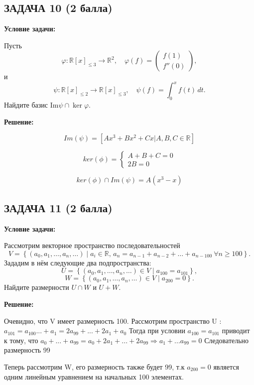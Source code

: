 \documentclass[a4paper,12pt]{article}
\begin{document}
\vspace{1cm}

\subsection{ЗАДАЧА 10 \hfill \textbf{(2 балла)}}
\textbf{Условие задачи:}

Пусть
\[
\varphi: \mathbb{R}[x]_{\leq 3} \to \mathbb{R}^2, \quad \varphi(f) =
\begin{pmatrix}
f(1) \\
f''(0)
\end{pmatrix},
\]
и
\[
\psi: \mathbb{R}[x]_{\leq 2} \to \mathbb{R}[x]_{\leq 3}, \quad \psi(f) = \int_0^x f(t) \, dt.
\]
Найдите базис \( \text{Im} \psi \cap \ker \varphi \).

\textbf{Решение:}

\[
Im(\psi) = \left[Ax^3 + Bx^2 + Cx | A, B, C \in \mathbb{R}\right]
\]

\[
ker(\phi) = \begin{cases}
    A + B + C = 0 \\
    2B = 0
\end{cases}
\]

\[
ker(\phi) \cap Im(\psi) = A(x^3-x)
\]

\vspace{1cm}

\subsection{ЗАДАЧА 11 \hfill \textbf{(2 балла)}}
\textbf{Условие задачи:}

Рассмотрим векторное пространство последовательностей
\[
V = \left\{ (a_0, a_1, \dots, a_n, \dots) \mid a_i \in \mathbb{R}, \, a_n = a_{n-1} + a_{n-2} + \dots + a_{n-100} \ \forall n \geq 100 \right\}.
\]
Зададим в нём следующие два подпространства:
\[
U = \left\{ (a_0, a_1, \dots, a_n, \dots) \in V \mid a_{100} = a_{101} \right\},
\]
\[
W = \left\{ (a_0, a_1, \dots, a_n, \dots) \in V \mid a_{200} = 0 \right\}.
\]
Найдите размерности \( U \cap W \) и \( U + W \).

\textbf{Решение:}

Очевидно, что V имеет размерность 100.  Рассмотрим пространство U : $a_{101} = a_{100}...+a_1 = 2a_{99} + ... + 2a_1 + a_0$  Тогда при условии $a_{100} = a_{101}$  приводит к тому, что $a_0 + ... + a_{99} = a_0 + 2a_1 + ... + 2a_{99} \Rightarrow a_1 + ... a_{99} = 0$ Следовательно размерность 99

Теперь рассмотрим W, его размерность также будет 99, т.к $a_{200}=0$ является одним линейным уравнением на начальных 100 элементах. 
\end{document}
